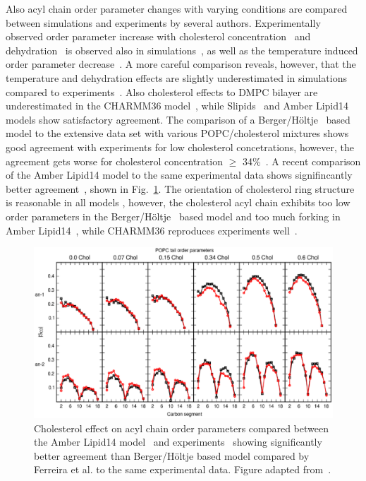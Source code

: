 \documentclass[aps,prl,superscriptaddress,twocolumn]{revtex4}
\begin{document}
Also acyl chain order parameter changes with varying conditions are compared between simulations and experiments
by several authors. Experimentally observed order parameter increase with cholesterol 
concentration~\cite{dufourc84,lafleur90,douliez95,urbina95,vermeer07,ferreira13} and dehydration~\cite{mallikarjunaiah11,dvinskikh05b} 
is observed also in simulations~\cite{mashl01,hogberg06,vermeer07,zhu07,lim12,ferreira13,jambeck13,madej15},
as well as the temperature induced order parameter decrease~\cite{douliez95,zhuang14}.
A more careful comparison reveals, however, that the temperature and dehydration effects are slightly underestimated in simulations 
compared to experiments~\cite{hogberg06,zhuang14}. Also cholesterol effects to DMPC bilayer are underestimated in the CHARMM36 model~\cite{lim12},
while Slipids~\cite{jambeck13} and Amber Lipid14~\cite{madej15} models show satisfactory agreement.
The comparison of a Berger/H{\"o}ltje~\cite{berger97,holtje01} based model to the extensive data set with 
various POPC/cholesterol mixtures shows good agreement with experiments for low cholesterol concetrations, 
however, the agreement gets worse for cholesterol concentration $\ge$ 34\%~\cite{ferreira13}. 
A recent comparison of the Amber Lipid14 model to the same experimental data shows signifincantly better 
agreement~\cite{madej15}, shown in Fig.~\ref{cholTAILmadej}. The orientation of cholesterol ring structure 
is reasonable in all models \cite{vermeer07,lim12,ferreira13,madej15}, 
however, the cholesterol acyl chain exhibits too low order parameters in the Berger/H{\"o}ltje~\cite{berger97,holtje01} 
based model \cite{ferreira13} and too much forking in Amber Lipid14~\cite{madej15}, while CHARMM36 reproduces experiments well~\cite{lim12}. 
\begin{figure}[]
  \includegraphics[width=17.2cm]{../Fig/cholTAILmadej.eps}
\newline
  \caption{\label{cholTAILmadej}
    Cholesterol effect on acyl chain order parameters compared between the Amber Lipid14 model~\cite{madej15} and experiments~\cite{ferreira13}
    showing significantly better agreement than Berger/H{\"o}ltje based model compared by Ferreira et al. \cite{ferreira13} to the same experimental data.
    Figure adapted from~\cite{madej15}. 
  } 
\end{figure}
\end{document}

